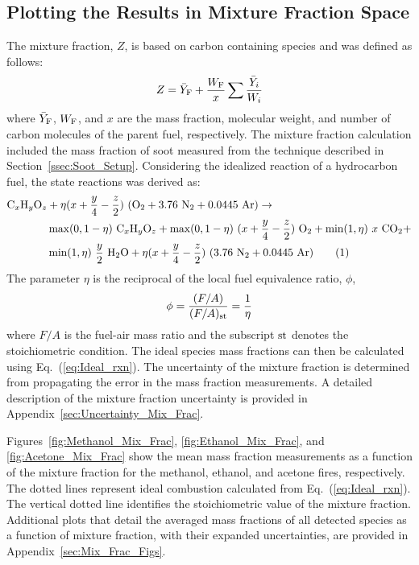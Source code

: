 \documentclass[12pt]{article}
\newcommand\numberthis{\addtocounter{equation}{1}\tag{\theequation}}
\begin{document}
\subsection{Plotting the Results in Mixture Fraction Space}
\label{ssec:Mixture_Fraction_Results}

The mixture fraction, $Z$, is based on carbon containing species and was defined as follows:
\begin{equation}\label{eq:Mixture_Fraction}
  Z = \bar{Y}_{\rm F} + \frac{W_{\rm F}}{x} \sum \frac{\bar{Y}_i}{W_{i}}
\end{equation}
where $\bar{Y}_{\rm F}$, ${W_{\rm F}}$, and $x$ are the mass fraction, molecular weight, and number of carbon molecules of the parent fuel, respectively. The mixture fraction calculation included the mass fraction of soot measured from the technique described in Section~\ref{ssec:Soot_Setup}.
Considering the idealized reaction of a hydrocarbon fuel, the state reactions was derived as:
\begin{align*}
{\rm C}_{x}{\rm H}_{y}{\rm O}_{z} & +\eta(x+\frac{y}{4}-\frac{z}{2})~({\rm O}_{2}+3.76~{\rm N}_{2}+0.0445~{\rm Ar}) \rightarrow  \\
          & \max(0,1-\eta)~{\rm C}_{x}{\rm H}_{y}{\rm O}_{z}+\max(0,1-\eta)~(x+\frac{y}{4}-\frac{z}{2})~{\rm O}_{2}+ \min(1,\eta)~x~{\rm CO}_{2} +  \\
          & \min(1,\eta)~\frac{y}{2}~{\rm H}_{2}{\rm O}+\eta(x+\frac{y}{4}-\frac{z}{2})~(3.76~{\rm N}_{2}+0.0445~{\rm Ar})  \numberthis \label{eq:Ideal_rxn}
\end{align*}
The parameter $\eta$ is the reciprocal of the local fuel equivalence ratio, $\phi$,
\begin{equation}\label{eq:Eta}
\phi=\frac{(F/A)}{(F/A)_{\rm st}}=\frac{1}{\eta}
\end{equation}
where $F/A$ is the fuel-air mass ratio and the subscript $\rm st$ denotes the stoichiometric condition. The ideal species mass fractions can then be calculated using Eq.~(\ref{eq:Ideal_rxn}). The uncertainty of the mixture fraction is determined from propagating the error in the mass fraction measurements. A detailed description of the mixture fraction uncertainty is provided in Appendix~\ref{sec:Uncertainty_Mix_Frac}.

Figures~\ref{fig:Methanol_Mix_Frac}, \ref{fig:Ethanol_Mix_Frac}, and \ref{fig:Acetone_Mix_Frac} show the mean mass fraction measurements as a function of the mixture fraction for the methanol, ethanol, and acetone fires, respectively. The dotted lines represent ideal combustion calculated from Eq.~(\ref{eq:Ideal_rxn}). The vertical dotted line identifies the stoichiometric value of the mixture fraction. Additional plots that detail the averaged mass fractions of all detected species as a function of mixture fraction, with their expanded uncertainties, are provided in Appendix~\ref{sec:Mix_Frac_Figs}.
\end{document}
